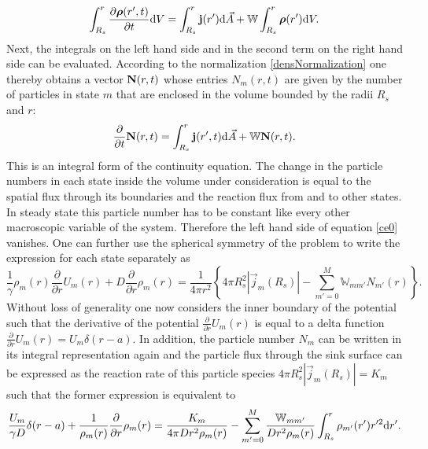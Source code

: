\begin{equation}
    \int_{R_s}^{r} \frac{\partial \boldsymbol{\mathbf{\rho}}(r',t)}{\partial t} {\rm d} V = \int_{R_s}^{r} \boldsymbol{\mathbf{j}}(r') {\rm d} \vec{A} + \mathbb{W} \int_{R_s}^{r} \boldsymbol{\mathbf{\rho}}(r') {\rm d} V.
    \label{ce0}
\end{equation}
Next, the integrals on the left hand side and in the second term on the right hand side can be evaluated. According to the normalization \eqref{densNormalization} one thereby obtains a vector $\boldsymbol{\mathbf{N}}(r,t)$ whose entries $N_m(r,t)$ are given by the number of particles in state $m$ that are enclosed in the volume bounded by the radii $R_s$ and $r$:
\begin{equation}
    \frac{\partial}{\partial t} \boldsymbol{\mathbf{N}}(r,t) = \int_{R_s}^{r} \boldsymbol{\mathbf{j}}(r',t) {\rm d} \vec{A} + \mathbb{W} \boldsymbol{\mathbf{N}}(r,t).
    \label{integral_ce}
\end{equation}
This is an integral form of the continuity equation. The change in the particle numbers in each state inside the volume under consideration is equal to the spatial flux through its boundaries and the reaction flux from and to other states. \\
In steady state this particle number has to be constant like every other macroscopic variable of the system. Therefore the left hand side of equation \eqref{ce0} vanishes. One can further use the spherical symmetry of the problem to write the expression for each state separately as
\begin{equation}
    \frac{1}{\gamma} \rho_m(r) \frac{\partial}{\partial r} U_m(r) + D\frac{\partial}{\partial r} \rho_m(r) =\frac{1}{4 \pi r^2} \left\{ 4 \pi R_s^2 |\vec{j}_m(R_s)| - \sum_{m'=0}^{M} \mathbb{W}_{mm'} N_{m'}(r) \right\}.
    \label{ce1}
\end{equation}
Without loss of generality one now considers the inner boundary of the potential such that the derivative of the potential $\frac{\partial}{\partial r}U_m(r)$ is equal to a delta function $\frac{\partial}{\partial r}U_m(r) = U_m \delta (r-a)$. In addition, the particle number $N_m$ can be written in its integral representation again and the particle flux through the sink surface can be expressed as the reaction rate of this particle species $4 \pi R_s^{2} |\vec{j}_m(R_s)| = K_m$ such that the former expression is equivalent to
\begin{equation}
    \frac{U_m}{\gamma D} \delta (r-a) + \frac{1}{\rho_m(r)}\frac{\partial}{\partial r} \rho_m(r) = \frac{K_m}{4 \pi D r^2 \rho_m(r)} - \sum_{m'=0}^{M} \frac{\mathbb{W}_{mm'}}{D r^{2} \rho_{m}(r)}\int_{R_s}^{r} \rho_{m'}(r')r'^2{\rm d} r'.
    \label{ce2}
\end{equation}
